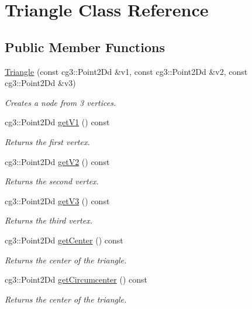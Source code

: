 \hypertarget{classTriangle}{}\section{Triangle Class Reference}
\label{classTriangle}
\subsection*{Public Member Functions}
\begin{DoxyCompactItemize}
\item 
\hyperlink{classTriangle_a3bb081f3c4d90284e27e1005a2b33599}{Triangle} (const cg3\+::\+Point2\+Dd \&v1, const cg3\+::\+Point2\+Dd \&v2, const cg3\+::\+Point2\+Dd \&v3)
\begin{DoxyCompactList}\small\item\em Creates a node from 3 vertices. \end{DoxyCompactList}\item 
cg3\+::\+Point2\+Dd \hyperlink{classTriangle_a488beca5f5e516f4914f7ec118d2205e}{get\+V1} () const
\begin{DoxyCompactList}\small\item\em Returns the first vertex. \end{DoxyCompactList}\item 
cg3\+::\+Point2\+Dd \hyperlink{classTriangle_a6b22d833c2cc9b738793da637642bfd0}{get\+V2} () const
\begin{DoxyCompactList}\small\item\em Returns the second vertex. \end{DoxyCompactList}\item 
cg3\+::\+Point2\+Dd \hyperlink{classTriangle_ad63dee82c3268c96bb5a6d353675c133}{get\+V3} () const
\begin{DoxyCompactList}\small\item\em Returns the third vertex. \end{DoxyCompactList}\item 
cg3\+::\+Point2\+Dd \hyperlink{classTriangle_a4d120f7288b7051a1cf442268edd328d}{get\+Center} () const
\begin{DoxyCompactList}\small\item\em Returns the center of the triangle. \end{DoxyCompactList}\item 
cg3\+::\+Point2\+Dd \hyperlink{classTriangle_a0ac42109ff92fc5b907283e10d7946b2}{get\+Circumcenter} () const
\begin{DoxyCompactList}\small\item\em Returns the center of the triangle. \end{DoxyCompactList}\item 

\end{DoxyCompactItemize}
